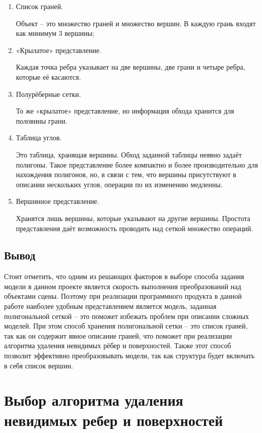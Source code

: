 \begin{enumerate}

\item Список граней. 

Объект – это множество граней и множество вершин. В каждую грань входят как минимум 3 вершины;
\item«Крылатое» представление. 

Каждая точка ребра указывает на две вершины, две грани и четыре ребра, которые её касаются.

\item Полурёберные сетки.

 То же «крылатое» представление, но информация обхода хранится для половины грани.
 
\item Таблица углов.

 Это таблица, хранящая вершины. Обход заданной таблицы неявно задаёт полигоны. Такое представление более компактно и более производительно для нахождения полигонов, но, в связи с тем, что вершины присутствуют в описании нескольких углов, операции по их изменению медленны.
 
\item Вершинное представление.

 Хранятся лишь вершины, которые указывают на другие вершины. Простота представления даёт возможность проводить над сеткой множество операций.

\end{enumerate}

\subsection{Вывод}
Стоит отметить, что одним из решающих факторов в выборе способа задания модели в данном проекте является скорость выполнения преобразований над объектами сцены. Поэтому при реализации программного продукта в данной работе наиболее удобным представлением является модель, заданная полигональной сеткой – это поможет избежать проблем при описании сложных моделей. При этом способ хранения полигональной сетки -- это список граней, так как он содержит явное описание граней, что поможет при реализации алгоритма удаления невидимых рёбер и поверхностей. Также этот способ позволит эффективно преобразовывать модели, так как структура будет включать в себя список вершин. 


\section{Выбор алгоритма удаления невидимых ребер и поверхностей}

